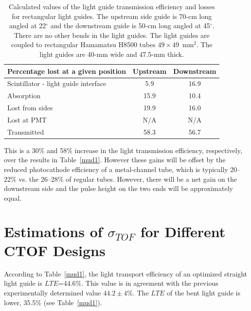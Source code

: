 \begin{table} [htbp]
\begin{center}
\begin{tabular}{|l|c|c|} \hline
Percentage lost at a given position  & Upstream & Downstream \\ \hline
Scintillator - light guide interface & 5.9      & 16.9       \\ \hline 
Absorption                           & 15.9	& 10.4 	     \\ \hline
Lost from sides  	             & 19.9 	& 16.0 	     \\ \hline
Lost at PMT  	                     & N/A 	& N/A 	     \\ \hline \hline 
Transmitted  	                     & 58.3 	& 56.7 	     \\ \hline
\end{tabular}
\end{center}
\caption{\small{Calculated values of the light guide transmission efficiency 
and losses for rectangular light guides.  The upstream side guide is 70-cm 
long angled at 22$^\circ$ and the downstream guide is 50-cm long angled at 
45$^\circ$.  There are no other bends in the light guides.  The light guides 
are coupled to rectangular Hamamatsu H8500 tubes $49\times 49$~mm$^2$.  The 
light guides are 40-mm wide and 47.5-mm thick.}}
\label{mud2}
\end{table}

This is a 30\% and 58\% increase in the light transmission efficiency, 
respectively, over the results in Table~\ref{mud1}.  However these gains 
will be offset by the reduced photocathode efficiency of a metal-channel 
tube, which is typically 20--22\% vs. the 26--28\% of regular tubes.  However, 
there will be a net gain on the downstream side and the pulse height on the 
two ends will be approximately equal. 

\section{Estimations of $\sigma_{TOF}$ for Different CTOF Designs}
\label{estimates}

According to Table~\ref{mud1}, the light transport efficiency of an optimized 
straight light guide is $LTE$=44.6\%.  This value is in agreement with the 
previous experimentally determined value $44.2 \pm 4$\%.  The $LTE$ of the 
bent light guide is lower, 35.5\% (see Table~\ref{mud1}).

